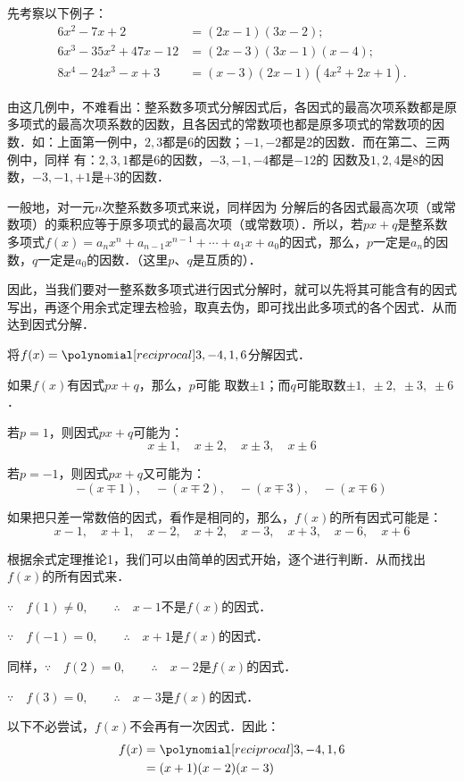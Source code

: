 先考察以下例子：
\[\begin{split}
    6x^2-7x+2&= (2x-1) (3x-2);\\
6x^3-35x^2+47x-12&= (2x-3) (3x-1)(x-4);\\
8x^4-24x^3-x+3&= (x-3) (2x-1)(4x^2+2x+1) .
\end{split}\]

由这几例中，不难看出：整系数多项式分解因式后，各因式的最高次项系数都是原多项式的最高次项系数的因数，且各因式的常数项也都是原多项式的常数项的因数．如：上面第一例中，$2, 3$都是6的因数；$-1,-2$都是2的因数．而在第二、三两例中，同样
有：$2, 3, 1$都是6的因数，$-3,-1,-4$都是$-12$的
因数及$1, 2, 4$是8的因数，$-3,-1,+1$是$+3$的因数．

一般地，对一元$n$次整系数多项式来说，同样因为
分解后的各因式最高次项（或常数项）的乘积应等于原多项式的最高次项（或常数项）．所以，若$px+q$是整系数多项式$f(x)=a_nx^n+a_{n-1}x^{n-1}+\cdots +a_1x+a_0$的因式，那么，$p$一定是$a_n$的因数，$q$一定是$a_0$的因数．（这里$p$、$q$是互质的）．

因此，当我们要对一整系数多项式进行因式分解时，就可以先将其可能含有的因式写出，再逐个用余式定理去检验，取真去伪，即可找出此多项式的各个因式．从而达到因式分解．


\begin{example}
    将$f(x)=\poly{3,-4,1,6}$分解因式．
\end{example}

\begin{analyze}
    如果$f(x)$有因式$px+q$，那么，$p$可能
取数$\pm1$；而$q$可能取数$\pm1,\;\pm2,\;\pm3,\;\pm6$．

若$p=1$，则因式$px+q$可能为：
\[x\pm1,\quad x\pm2,\quad x\pm3,\quad x\pm6\]

若$p=-1$，则因式$px+q$又可能为：
\[- (x\mp 1) ,\quad - (x\mp 2) ,\quad - (x\mp 3) ,\quad -(x\mp 6)\]

如果把只差一常数倍的因式，看作是相同的，那么，$f(x)$的所有因式可能是：
\[x-1,\quad x+1, \quad x-2,\quad x+2,\quad x-3,\quad x+3,\quad x-6,\quad x+6\]

根据余式定理推论1，我们可以由简单的因式开始，逐个进行判断．从而找出$f(x)$的所有因式来．    
\end{analyze}


\begin{solution}
$\because\quad f(1)\ne 0,\qquad \therefore\quad x-1$不是$f(x)$的因式．

$\because\quad f(-1)= 0,\qquad \therefore\quad x+1$是$f(x)$的因式．

同样，$\because\quad f(2)= 0,\qquad \therefore\quad x-2$是$f(x)$的因式．

$\because\quad f(3)= 0,\qquad \therefore\quad x-3$是$f(x)$的因式．

以下不必尝试，$f(x)$不会再有一次因式．因此：
\[\begin{split}
 f(x)&=\poly{3,-4,1,6}\\
 &=(x+1)(x-2)(x-3)   
\end{split}\]
\end{solution}

